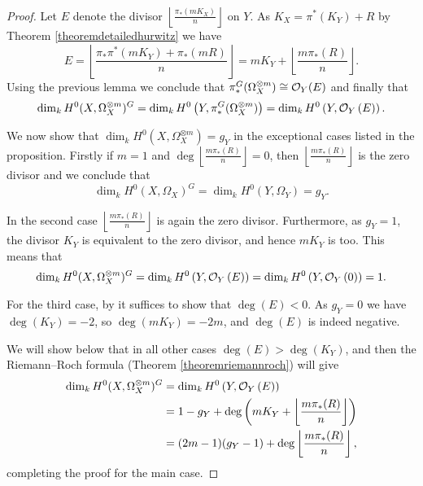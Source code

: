     \begin{proof}
    Let $E$ denote the divisor $\left\lfloor \frac{\pi_*(mK_X)}{n} \right\rfloor$ on $Y$. As $K_X=\pi^*(K_Y)+R$ by Theorem \ref{theoremdetailedhurwitz} we have
        \[ 
        E = \left \lfloor \frac{\pi_*\pi^*(mK_Y) + \pi_*(mR)}{n} \right \rfloor = mK_Y + \left \lfloor \frac{m\pi_*(R)}{n} \right \rfloor.
        \]
    Using the previous lemma we conclude that $\pi_*^G(\Omega_X^{\otimes m}) \cong {\cal O}_Y (E)$ and finally that
        \begin{equation*}
        \dim_k H^0(X,\Omega_X^{\otimes m})^G = \dim_k H^0\left(Y, \pi_*^G(\Omega_X^{\otimes m})\right) = \dim_k H^0\left(Y, {\cal O}_Y\left( E \right) \right).
        \end{equation*}
    
    
    We now show that $\dim_kH^0(X,\Omega_X^{\otimes m}) = g_Y$ in the exceptional cases listed in the proposition.
    Firstly if $m=1$ and $\deg \left\lfloor\frac{m\pi_*(R)}{n} \right\rfloor=0$, then $\left\lfloor\frac{m\pi_*(R)}{n} \right\rfloor$ is the zero divisor and we conclude that 
        \begin{equation*}
        \dim_kH^0(X,\Omega_X)^G = \dim_kH^0(Y, \Omega_Y) = g_Y.
        \end{equation*}
    
    
    In the second case $\left\lfloor \frac{m\pi_*(R)}{n} \right\rfloor$ is again the zero divisor. 
    Furthermore, as $g_Y=1$, the divisor $K_Y$ is equivalent to the zero divisor, and hence $mK_Y$ is too. 
    This means that
        \begin{equation*}
        \dim_kH^0(X,\Omega_X^{\otimes m})^G = \dim_kH^0\left( Y,{\cal O}_Y\left( E \right) \right) = \dim_k  H^0\left( Y,{\cal O}_Y\left( 0 \right) \right) = 1.
        \end{equation*}
    
    
    For the third case, by \cite[Chap.\ IV, Ex.\ 1.3.4]{hart} it suffices to show that $\deg \left( E \right) < 0$.
    As $g_Y=0$ we have $\deg(K_Y)=-2$, so $\deg(mK_Y)=-2m$, and $\deg \left( E \right)$ is indeed negative.
    
    
    
    We will show below that in all other cases $\deg(E) > \deg(K_Y)$, and then the Riemann--Roch formula (Theorem \ref{theoremriemannroch}) will give 
        \begin{align*}
        \dim_kH^0(X,\Omega_X^{\otimes m})^G  & = \dim_kH^0\left(Y,{\cal O}_Y\left( E \right)\right) \\
        & =  1-g_Y+\deg\left(mK_Y+\left\lfloor{\frac{m\pi_*(R)}{n}}\right\rfloor\right) \\
        & =  (2m-1)(g_Y-1)+\deg\left\lfloor{\frac{m\pi_*(R)}{n}}\right\rfloor,
        \end{align*}
    completing the proof for the main case.
    

\end{proof}
